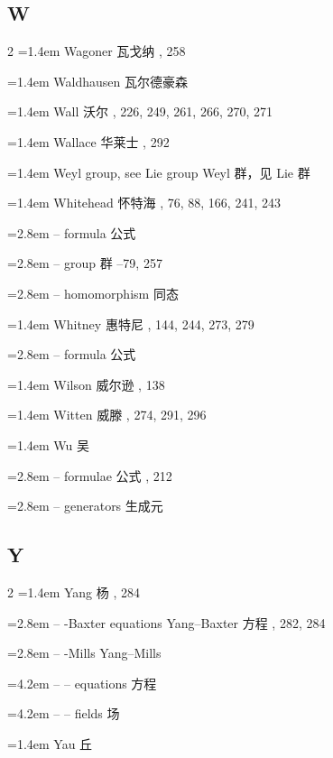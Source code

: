 \subsection*{W}
\small
\begin{multicols}{2}
\noindent\hangindent=1.4em Wagoner \quad 瓦戈纳 , 258\par
\noindent\hangindent=1.4em Waldhausen \quad 瓦尔德豪森 \par
\noindent\hangindent=1.4em Wall \quad 沃尔 , 226, 249, 261, 266, 270, 271\par
\noindent\hangindent=1.4em Wallace \quad 华莱士 , 292\par
\noindent\hangindent=1.4em Weyl group, see Lie group \quad Weyl 群，见 Lie 群 \quad\par
\noindent\hangindent=1.4em Whitehead \quad 怀特海 , 76, 88, 166, 241, 243\par
\noindent\hangindent=2.8em -- formula \quad 公式 \par
\noindent\hangindent=2.8em -- group \quad 群 --79, 257\par
\noindent\hangindent=2.8em -- homomorphism \quad 同态 \par
\noindent\hangindent=1.4em Whitney \quad 惠特尼 , 144, 244, 273, 279\par
\noindent\hangindent=2.8em -- formula \quad 公式 \par
\noindent\hangindent=1.4em Wilson \quad 威尔逊 , 138\par
\noindent\hangindent=1.4em Witten \quad 威滕 , 274, 291, 296\par
\noindent\hangindent=1.4em Wu \quad 吴 \quad\par
\noindent\hangindent=2.8em -- formulae \quad 公式 , 212\par
\noindent\hangindent=2.8em -- generators \quad 生成元 \par
\end{multicols}

\subsection*{Y}
\small
\begin{multicols}{2}
\noindent\hangindent=1.4em Yang \quad 杨 , 284\par
\noindent\hangindent=2.8em -- -Baxter equations \quad Yang--Baxter 方程 , 282, 284\par
\noindent\hangindent=2.8em -- -Mills \quad Yang--Mills \quad\par
\noindent\hangindent=4.2em -- -- equations \quad 方程 \par
\noindent\hangindent=4.2em -- -- fields \quad 场 \par
\noindent\hangindent=1.4em Yau \quad 丘 \par
\end{multicols}

